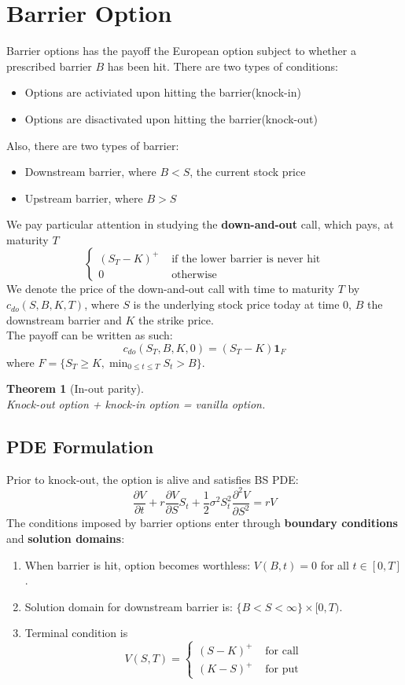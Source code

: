 \documentclass[12pt]{article}
\newtheorem{theorem}{Theorem}[section]
\theoremstyle{definition}
\begin{document}
\section{Barrier Option}
Barrier options has the payoff the European option subject to whether a prescribed barrier $B$ has been hit. There are two types of conditions:
\begin{itemize}
  \item Options are activiated upon hitting the barrier(knock-in)
  \item Options are disactivated upon hitting the barrier(knock-out)
\end{itemize}
Also, there are two types of barrier:
\begin{itemize}
  \item Downstream barrier, where $B<S$, the current stock price
  \item Upstream barrier, where $B>S$
\end{itemize}
We pay particular attention in studying the \textbf{down-and-out} call, which pays, at maturity $T$
\[
\begin{cases}
(S_T-K)^{+} & \text{ if the lower barrier is never hit}\\
0 & \text{ otherwise}
\end{cases}
\]
We denote the price of the down-and-out call with time to maturity $T$ by $c_{do}(S,B,K,T)$, where $S$ is the underlying stock price today at time $0$, $B$ the downstream barrier and $K$ the strike price.\\
The payoff can be written as such:
\[
c_{do}(S_T,B,K,0)=(S_T-K)\mathbf{1}_F
\]
where $F=\{S_T\geq K, \min_{0\leq t\leq T} S_t>B\}$.
\begin{theorem}[In-out parity]
\hfill\\\normalfont Knock-out option + knock-in option = vanilla option.
\end{theorem}
\subsection{PDE Formulation}
Prior to knock-out, the option is alive and satisfies BS PDE:
\[
\frac{\partial V}{\partial t}+r\frac{\partial V}{\partial S}S_t +\frac{1}{2}\sigma^2S_t^2\frac{\partial^2 V}{\partial S^2}=rV
\]
The conditions imposed by barrier options enter through \textbf{boundary conditions} and \textbf{solution domains}:
\begin{enumerate}
  \item When barrier is hit, option becomes worthless: $V(B,t)=0$ for all $t\in [0,T]$.
  \item Solution domain for downstream barrier is: $\{B<S<\infty\}\times[0,T)$.
  \item Terminal condition is 
  \[
V(S,T)=\begin{cases} (S-K)^{+} &\text{ for call}\\
(K-S)^{+} &\text{ for put}
\end{cases}
  \]
\end{enumerate}
\end{document}
